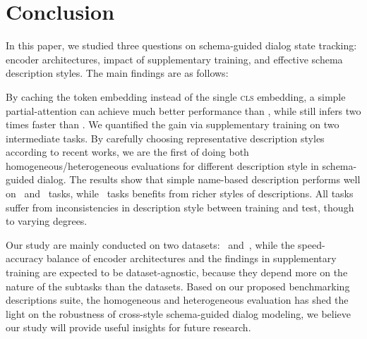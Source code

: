 \section{Conclusion}
\label{sec:conclusion}
In this paper, we studied three questions on schema-guided dialog
state tracking: encoder architectures, impact of supplementary
training, and effective schema description styles.  The main findings
are as follows:

By caching the token embedding instead of the single \textsc{cls}
embedding, a simple partial-attention \FE can achieve much better
performance than \DE, while still infers two times faster than \CE.
We quantified the gain via supplementary training on two intermediate
tasks.  By carefully choosing representative description styles
according to recent works, we are the first of doing both
homogeneous/heterogeneous evaluations for different description style
in schema-guided dialog. The results show that simple name-based
description performs well on \IC~and \RSI~tasks, while \NSL~tasks
benefits from richer styles of descriptions.  All tasks suffer from
inconsistencies in description style between training and test, though
to varying degrees.

Our study are mainly conducted on two datasets: \sgdst~and~\multiwoz,
while the speed-accuracy balance of encoder architectures and the
findings in supplementary training are expected to be
dataset-agnostic, because they depend more on the nature of the
subtasks than the datasets. Based on our proposed benchmarking
descriptions suite, the homogeneous and heterogeneous evaluation has
shed the light on the robustness of cross-style schema-guided dialog
modeling, we believe our study will provide useful insights for future
research.



